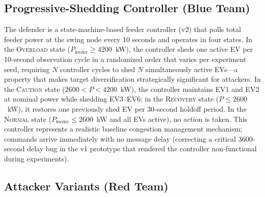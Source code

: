 \subsection{Progressive-Shedding Controller (Blue Team)}\label{sec:controller}

The defender is a state-machine-based feeder controller (v2) that polls total feeder power at the swing node every 10 seconds and operates in four states.
In the \textsc{Overload} state ($P_{\text{feeder}} \geq 4200$~kW), the controller sheds one active EV per 10-second observation cycle in a randomized order that varies per experiment seed, requiring $N$ controller cycles to shed $N$ simultaneously active EVs---a property that makes target diversification strategically significant for attackers.
In the \textsc{Caution} state ($2600 < P < 4200$~kW), the controller maintains EV1 and EV2 at nominal power while shedding EV3--EV6; in the \textsc{Recovery} state ($P \leq 2600$~kW), it restores one previously shed EV per 30-second holdoff period.
In the \textsc{Normal} state ($P_{\text{feeder}} \leq 2600$~kW and all EVs active), no action is taken.
This controller represents a realistic baseline congestion management mechanism; commands arrive immediately with no message delay (correcting a critical 3600-second delay bug in the v1 prototype that rendered the controller non-functional during experiments).

\subsection{Attacker Variants (Red Team)}\label{sec:attackers}

